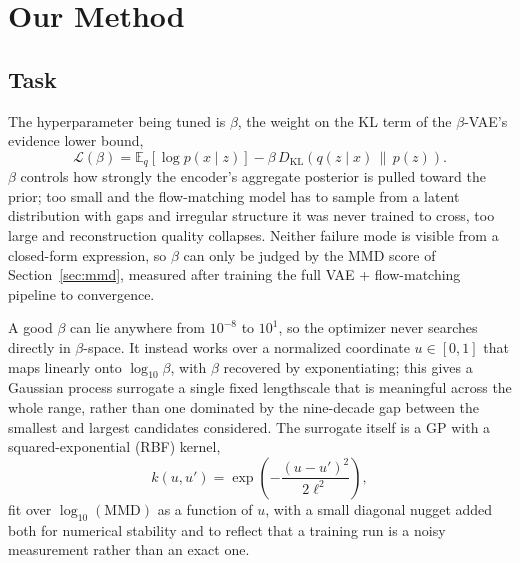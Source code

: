\documentclass[11pt]{article}
\begin{document}
\section{Our Method}
\label{sec:method}

\subsection{Task}
\label{sec:task}

The hyperparameter being tuned is $\beta$, the weight on the KL term of
the $\beta$-VAE's evidence lower bound,
\begin{equation}
\mathcal{L}(\beta) = \mathbb{E}_q\!\left[\log p(x \mid z)\right]
  - \beta \, D_{\mathrm{KL}}\!\left(q(z \mid x)\,\|\,p(z)\right).
\end{equation}
$\beta$ controls how strongly the encoder's aggregate posterior is pulled
toward the prior; too small and the flow-matching model has to sample
from a latent distribution with gaps and irregular structure it was never
trained to cross, too large and reconstruction quality collapses. Neither
failure mode is visible from a closed-form expression, so $\beta$ can only
be judged by the MMD score of Section~\ref{sec:mmd}, measured after
training the full VAE + flow-matching pipeline to convergence.

A good $\beta$ can lie anywhere from $10^{-8}$ to $10^{1}$, so the
optimizer never searches directly in $\beta$-space. It instead works over
a normalized coordinate $u \in [0,1]$ that maps linearly onto
$\log_{10}\beta$, with $\beta$ recovered by exponentiating; this gives a
Gaussian process surrogate a single fixed lengthscale that is meaningful
across the whole range, rather than one dominated by the nine-decade gap
between the smallest and largest candidates considered. The surrogate
itself is a GP with a squared-exponential (RBF) kernel,
\begin{equation}
k(u, u') = \exp\!\left(-\frac{(u-u')^2}{2\ell^2}\right),
\end{equation}
fit over $\log_{10}(\mathrm{MMD})$ as a function of $u$, with a small
diagonal nugget added both for numerical stability and to reflect that a
training run is a noisy measurement rather than an exact one.
\end{document}
